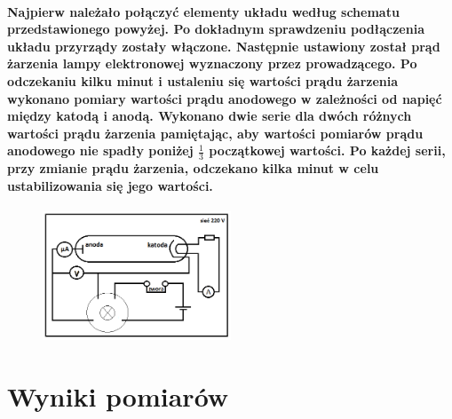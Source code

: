 \documentclass[a4paper,10pt]{article}
\begin{document}
\paragraph{Najpierw należało połączyć elementy układu według schematu przedstawionego powyżej. Po dokładnym sprawdzeniu podłączenia układu przyrządy zostały włączone. Następnie ustawiony został prąd żarzenia lampy elektronowej wyznaczony przez prowadzącego. Po odczekaniu kilku minut i ustaleniu się wartości prądu żarzenia wykonano pomiary wartości prądu anodowego w zależności od napięć między katodą i anodą. Wykonano dwie serie dla dwóch różnych wartości prądu żarzenia pamiętając, aby wartości pomiarów prądu anodowego nie spadły poniżej $\frac{1}{3}$ początkowej wartości. Po każdej serii, przy zmianie prądu żarzenia, odczekano kilka minut w celu ustabilizowania się jego wartości.}

\begin{figure}[H]
\includegraphics[width=0.5\textwidth]{Schemat.png}
\end{figure}


\section{Wyniki pomiarów}
\end{document}
